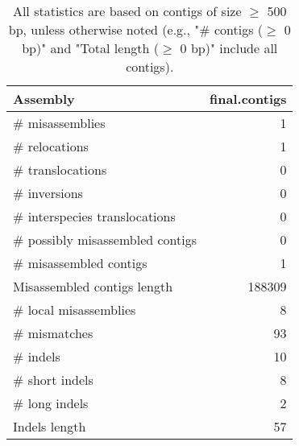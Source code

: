 \documentclass[12pt,a4paper]{article}
\begin{document}
\begin{table}[ht]
\begin{center}
\caption{All statistics are based on contigs of size $\geq$ 500 bp, unless otherwise noted (e.g., "\# contigs ($\geq$ 0 bp)" and "Total length ($\geq$ 0 bp)" include all contigs).}
\begin{tabular}{|l*{1}{|r}|}
\hline
Assembly & final.contigs \\ \hline
\# misassemblies & 1 \\ \hline
\hspace{5mm}\# relocations & 1 \\ \hline
\hspace{5mm}\# translocations & 0 \\ \hline
\hspace{5mm}\# inversions & 0 \\ \hline
\hspace{5mm}\# interspecies translocations & 0 \\ \hline
\# possibly misassembled contigs & 0 \\ \hline
\# misassembled contigs & 1 \\ \hline
Misassembled contigs length & 188309 \\ \hline
\# local misassemblies & 8 \\ \hline
\# mismatches & 93 \\ \hline
\# indels & 10 \\ \hline
\hspace{5mm}\# short indels & 8 \\ \hline
\hspace{5mm}\# long indels & 2 \\ \hline
Indels length & 57 \\ \hline
\end{tabular}
\end{center}
\end{table}
\end{document}
